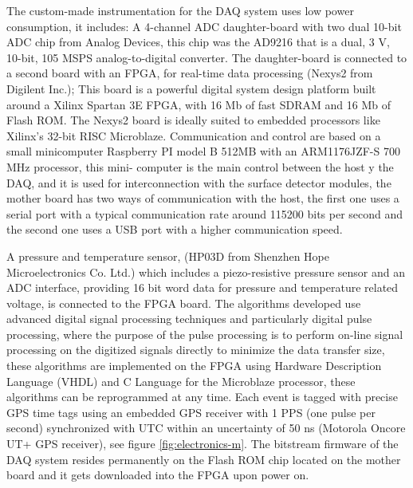 

The custom-made instrumentation for the DAQ system uses low power consumption,
it includes: A 4-channel ADC daughter-board with two dual 10-bit ADC chip
from Analog Devices, this chip was the AD9216 that is a dual, 3 V, 10-bit,
105 MSPS analog-to-digital converter. The daughter-board is connected to a
second board with an FPGA, for real-time data processing (Nexys2 from Digilent
Inc.); This board is a powerful digital system design platform built around a
Xilinx Spartan 3E FPGA, with 16 Mb of fast SDRAM and 16 Mb of Flash ROM. The
Nexys2 board is ideally suited to embedded processors like Xilinx's 32-bit
RISC Microblaze. Communication and control are based on a small minicomputer
Raspberry PI model B 512MB with an ARM1176JZF-S 700 MHz processor, this mini-
computer is the main control between the host y the DAQ, and it is used for
interconnection with the surface detector modules, the mother board has two
ways of communication with the host, the first one uses a serial port with a
typical communication rate around 115200 bits per second and the second one
uses a USB port with a higher communication speed.

A pressure and temperature sensor, (HP03D from Shenzhen Hope Microelectronics
Co. Ltd.) which includes a piezo-resistive pressure sensor and an ADC interface,
providing 16 bit word data for pressure and temperature related voltage, is
connected to the FPGA board. The algorithms developed use advanced digital
signal processing techniques and particularly digital pulse processing, where
the purpose of the pulse processing is to perform on-line signal processing
on the digitized signals directly to minimize the data transfer size, these
algorithms are implemented on the FPGA using Hardware Description Language
(VHDL) and C Language for the Microblaze processor, these algorithms can be
reprogrammed at any time. Each event is tagged with precise GPS time tags using
an embedded GPS receiver with 1 PPS (one pulse per second) synchronized with
UTC within an uncertainty of 50 ns (Motorola Oncore UT+ GPS receiver), see
figure \ref{fig:electronics-m}. The bitstream firmware of the DAQ system
resides permanently on the Flash ROM chip located on the mother board and it
gets downloaded into the FPGA upon power on.

